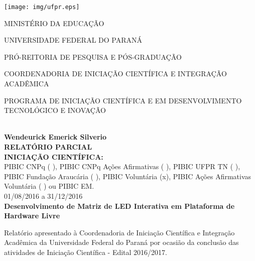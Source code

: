 \documentclass[a4paper,12pt]{article}
\begin{document}
  \begin{titlepage}
    \begin{center}

    \begin{minipage}[t]{0.25\textwidth}
    \vspace{0pt}
    \texttt{[image: img/ufpr.eps]}
    \end{minipage}
    \begin{minipage}[t]{0.74\textwidth}
    \vspace{0pt}
    \begin{center}
     {\footnotesize MINISTÉRIO DA EDUCAÇÃO

     UNIVERSIDADE FEDERAL DO PARANÁ

     PRÓ-REITORIA DE PESQUISA E PÓS-GRADUAÇÃO

     COORDENADORIA DE INICIAÇÃO CIENTÍFICA E INTEGRAÇÃO ACADÊMICA

    PROGRAMA DE INICIAÇÃO CIENTÍFICA E EM DESENVOLVIMENTO TECNOLÓGICO E INOVAÇÃO}


    \end{center}
    \end{minipage}\\[1.5cm]

    {\Large {\textbf{Wendeurick Emerick Silverio}}}\\[1.5cm]
    {\large {\textbf{RELATÓRIO PARCIAL}}}\\[1.5cm]
    {\large {\textbf{INICIAÇÃO CIENTÍFICA:}}}\\
    {PIBIC CNPq ( ), PIBIC CNPq Ações Afirmativas ( ), PIBIC UFPR TN ( ), PIBIC Fundação Araucária ( ), PIBIC Voluntária (x), PIBIC Ações Afirmativas Voluntária ( ) ou PIBIC EM.}\\[1cm]
    {\large {01/08/2016 a 31/12/2016}}\\[1.5cm]

    {\Large \textbf{Desenvolvimento de Matriz de LED Interativa em Plataforma de Hardware Livre}}\\[1cm]


      \hspace{.45\textwidth} %
       \begin{minipage}{.5\textwidth}
       Relatório apresentado à Coordenadoria de Iniciação Científica e Integração Acadêmica da Universidade Federal do Paraná por ocasião da conclusão das atividades de Iniciação Científica - Edital 2016/2017.
      \end{minipage}
      \\[1.5cm]


\end{center}
\end{titlepage}
\end{document}
